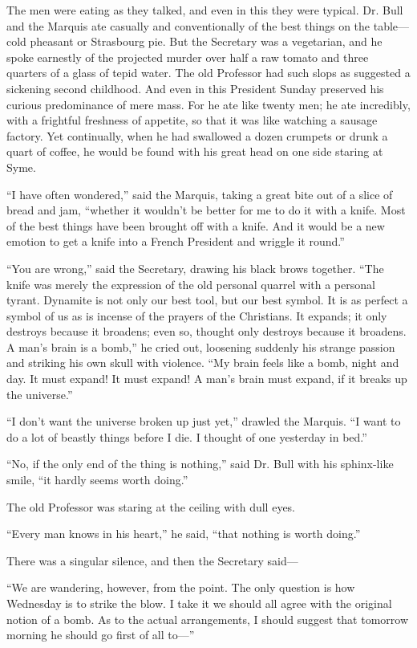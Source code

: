 The men were eating as they talked, and even in this they were typical. Dr. Bull and the Marquis ate casually and conventionally of the best things on the table⁠—cold pheasant or Strasbourg pie. But the Secretary was a vegetarian, and he spoke earnestly of the projected murder over half a raw tomato and three quarters of a glass of tepid water. The old Professor had such slops as suggested a sickening second childhood. And even in this President Sunday preserved his curious predominance of mere mass. For he ate like twenty men; he ate incredibly, with a frightful freshness of appetite, so that it was like watching a sausage factory. Yet continually, when he had swallowed a dozen crumpets or drunk a quart of coffee, he would be found with his great head on one side staring at Syme.

“I have often wondered,” said the Marquis, taking a great bite out of a slice of bread and jam, “whether it wouldn’t be better for me to do it with a knife. Most of the best things have been brought off with a knife. And it would be a new emotion to get a knife into a French President and wriggle it round.”

“You are wrong,” said the Secretary, drawing his black brows together. “The knife was merely the expression of the old personal quarrel with a personal tyrant. Dynamite is not only our best tool, but our best symbol. It is as perfect a symbol of us as is incense of the prayers of the Christians. It expands; it only destroys because it broadens; even so, thought only destroys because it broadens. A man’s brain is a bomb,” he cried out, loosening suddenly his strange passion and striking his own skull with violence. “My brain feels like a bomb, night and day. It must expand! It must expand! A man’s brain must expand, if it breaks up the universe.”

“I don’t want the universe broken up just yet,” drawled the Marquis. “I want to do a lot of beastly things before I die. I thought of one yesterday in bed.”

“No, if the only end of the thing is nothing,” said Dr. Bull with his sphinx-like smile, “it hardly seems worth doing.”

The old Professor was staring at the ceiling with dull eyes.

“Every man knows in his heart,” he said, “that nothing is worth doing.”

There was a singular silence, and then the Secretary said⁠—

“We are wandering, however, from the point. The only question is how Wednesday is to strike the blow. I take it we should all agree with the original notion of a bomb. As to the actual arrangements, I should suggest that tomorrow morning he should go first of all to⁠—”

